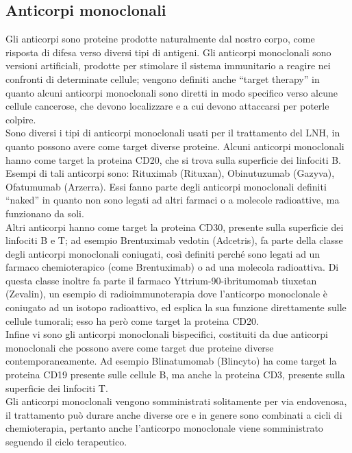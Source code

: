 \subsection{Anticorpi monoclonali}
Gli anticorpi sono proteine prodotte naturalmente dal nostro corpo, come risposta di difesa verso diversi tipi di 
antigeni. Gli anticorpi monoclonali sono versioni artificiali, prodotte per stimolare il sistema immunitario a reagire 
nei confronti di determinate cellule; vengono definiti anche “target therapy” in quanto alcuni anticorpi monoclonali 
sono diretti in modo specifico verso alcune cellule cancerose, che devono localizzare e a cui devono attaccarsi per 
poterle colpire\cite{IMMUNOTP}.\\
Sono diversi i tipi di anticorpi monoclonali usati per il trattamento del LNH, in quanto possono avere come target 
diverse proteine. 
Alcuni anticorpi monoclonali hanno come target la proteina CD20, che si trova sulla superficie dei linfociti B. 
Esempi di tali anticorpi sono: Rituximab (Rituxan), Obinutuzumab (Gazyva), Ofatumumab (Arzerra). 
Essi fanno parte degli anticorpi monoclonali definiti “naked” in quanto non sono legati ad altri farmaci o a 
molecole radioattive, ma funzionano da soli\cite{LLSIMMUNO}.\\
Altri anticorpi hanno come target la proteina CD30, presente sulla superficie dei linfociti B e T; 
ad esempio Brentuximab vedotin (Adcetris), fa parte della classe degli anticorpi monoclonali coniugati, 
così definiti perché sono legati ad un farmaco chemioterapico (come Brentuximab) o ad una molecola radioattiva. 
Di questa classe inoltre fa parte il farmaco Yttrium-90-ibritumomab tiuxetan (Zevalin), un esempio di 
radioimmunoterapia dove l’anticorpo monoclonale è coniugato ad un isotopo radioattivo, 
ed esplica la sua funzione direttamente sulle cellule tumorali; esso ha però come target 
la proteina CD20\cite{LLSIMMUNO}.\\
Infine vi sono gli anticorpi monoclonali bispecifici, costituiti da due anticorpi monoclonali che possono avere come 
target due proteine diverse contemporaneamente. Ad esempio Blinatumomab (Blincyto) ha come target la proteina CD19 
presente sulle cellule B, ma anche la proteina CD3, presente sulla superficie dei linfociti T\cite{LLSIMMUNO}.\\
Gli anticorpi monoclonali vengono somministrati solitamente per via endovenosa, il trattamento può durare anche 
diverse ore e in genere sono combinati a cicli di chemioterapia, pertanto anche l’anticorpo monoclonale 
viene somministrato seguendo il ciclo terapeutico\cite{IMMUNOTP}.\\

